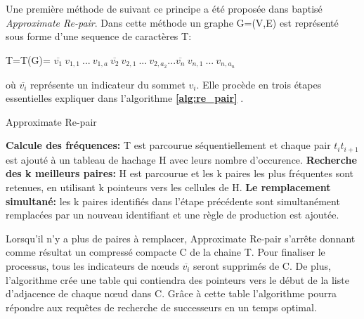		Une première méthode de suivant ce principe a été proposée dans \citep{claude2010fast} baptisé \textit{Approximate Re-pair}. Dans cette méthode un graphe G=(V,E) est représenté sous forme d'une sequence de caractères T: \begin{center}
		T=T(G)= $\overline{v_{1}}\ v_{1,1}\ ...\ v_{1,a}\ \overline{v_{2}}\ v_{2,1}\ ...\ v_{2,a_{2}} ... \overline{v_{n}}\ v_{n,1}\ ...\ v_{n,a_{n}}\ $						
\end{center}	
où $\overline{v_{i}}$ représente un indicateur du sommet $v_{i}$. Elle procède en trois étapes essentielles expliquer dans l'algorithme \textbf{\ref{alg:re_pair}} .
	\begin{algorithm}
		\caption{Approximate Re-pair}
		\label{alg:re_pair}
		\begin{algorithmic}[1]
			\STATE \textbf{Calcule des fréquences:} T est parcourue séquentiellement et chaque pair $t_{i}t_{i+1}$ est ajouté à un tableau de hachage H avec leurs nombre d'occurence. 
			\STATE \textbf{Recherche des k meilleurs paires:}  H est parcourue et  les k paires les plus fréquentes sont retenues, en utilisant k pointeurs vers les cellules de H.
			\STATE \textbf{Le remplacement simultané:} les k paires identifiés dans l'étape précédente sont simultanément remplacées par un nouveau identifiant et une règle de production est ajoutée.
		\end{algorithmic}
	\end{algorithm}
	Lorsqu'il n'y a plus de paires à remplacer, Approximate Re-pair s'arrête donnant comme résultat un compressé compacte C de la chaine T. Pour finaliser le processus, tous les indicateurs de nœuds $\overline{v_{i}}$ seront supprimés de C. De plus, l'algorithme crée une table qui contiendra des pointeurs vers le début de la liste d'adjacence de chaque nœud dans C. Grâce à cette table l'algorithme pourra répondre aux requêtes de recherche de successeurs en un temps optimal.